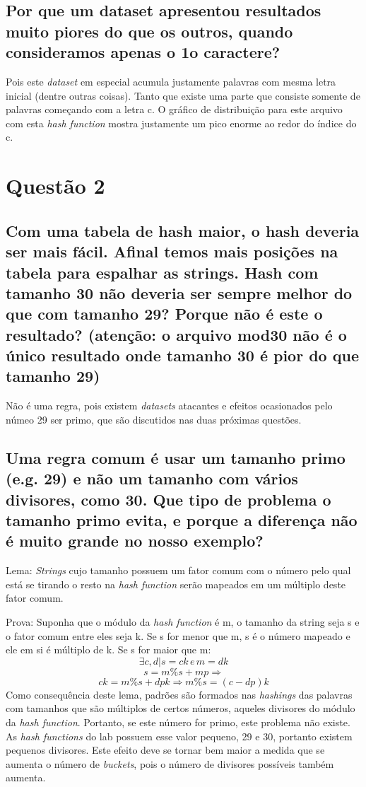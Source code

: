 \documentclass{article}[twocolumn]
\begin{document}
	\subsection{Por que um dataset apresentou resultados muito piores do que os outros,
	quando consideramos apenas o 1o caractere?}
	Pois este \textit{dataset} em especial acumula justamente palavras com mesma letra inicial
	(dentre outras coisas). Tanto que existe uma parte que consiste somente de palavras
	come\c{c}ando com a letra c. O gr\'afico de distribui\c{c}\~ao para este arquivo
	com esta \textit{hash function} mostra justamente um pico enorme ao redor do \'indice
	do c.

	\section{Quest\~ao 2}
	\subsection{Com uma tabela de hash maior, o hash deveria ser mais fácil. Afinal temos mais
	posições na tabela para espalhar as strings. Hash com tamanho 30 não deveria ser sempre melhor
	do que com tamanho 29?  Porque não é este o resultado? (atenção: o arquivo mod30 não é o único
	resultado onde tamanho 30 é pior do que tamanho 29)}
	N\~ao \'e uma regra, pois existem \textit{datasets} atacantes e efeitos ocasionados pelo
	n\'umeo 29 ser primo, que s\~ao discutidos nas duas pr\'oximas quest\~oes.
	\subsection{Uma regra comum  é usar um tamanho primo (e.g. 29) e não um tamanho com
	vários divisores, como 30. Que tipo de problema o tamanho primo evita, e
	porque a diferença não é muito grande no nosso exemplo?}
	Lema: \textit{Strings} cujo tamanho possuem um fator comum com o n\'umero pelo qual est\'a se
	tirando o resto na \textit{hash function} ser\~ao mapeados em um m\'ultiplo deste
	fator comum.

	Prova: Suponha que o m\'odulo da \textit{hash function} \'e m, o tamanho da string seja s e
	o fator comum entre eles seja k. Se s for menor que m, s \'e o n\'umero mapeado e ele em si
	\'e m\'ultiplo de k. Se s for maior que m:
	\begin{equation}
		\exists c, d | s = ck \, e \, m = dk
		\nonumber
	\end{equation}
	\begin{equation}
		s = m\%s + mp\Rightarrow
		\nonumber
	\end{equation}
	\begin{equation}
		ck = m\%s + dpk \Rightarrow m\%s = (c - dp)k
		\nonumber
	\end{equation}
	Como consequ\^encia deste lema, padr\~oes s\~ao formados nas \textit{hashings} das
	palavras com tamanhos que s\~ao m\'ultiplos de certos n\'umeros, aqueles divisores
	do m\'odulo da \textit{hash function}. Portanto, se este n\'umero for primo, este
	problema n\~ao existe. As \textit{hash functions} do lab possuem esse valor pequeno,
	29 e 30, portanto existem pequenos divisores. Este efeito deve se tornar bem maior
	a medida que se aumenta o n\'umero de \textit{buckets}, pois o n\'umero de divisores
	poss\'iveis tamb\'em aumenta.
\end{document}
